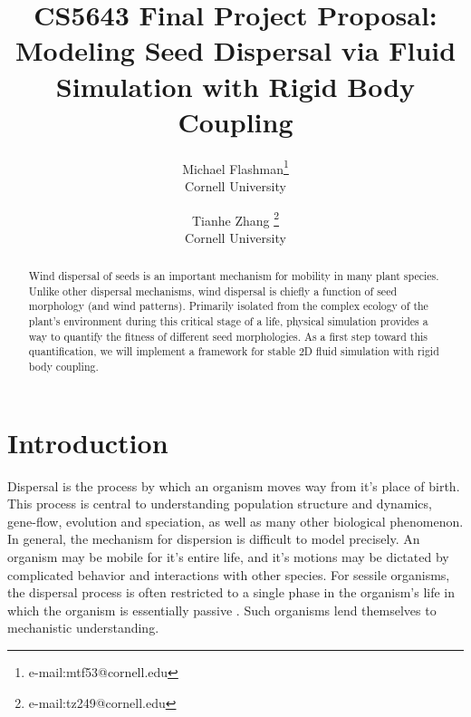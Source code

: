 \documentclass[annual]{acmsiggraph}
\title{CS5643 Final Project Proposal: \\ Modeling Seed Dispersal via Fluid Simulation with Rigid Body Coupling}
\author{Michael Flashman\thanks{e-mail:mtf53@cornell.edu}\\Cornell University \and Tianhe Zhang \thanks{e-mail:tz249@cornell.edu}\\Cornell University}
\begin{document}
\maketitle

\begin{abstract}
Wind dispersal of  seeds is an important mechanism for mobility in many plant species.  Unlike other dispersal mechanisms, wind dispersal is chiefly a function of seed morphology (and wind patterns).  Primarily isolated from the  complex ecology of the plant's environment during this critical stage of a life, physical simulation provides a way to  quantify the fitness of different seed morphologies.   As a first step toward this quantification, we will implement a  framework for stable 2D fluid simulation with rigid body coupling.
\end{abstract}

\keywordlist

\copyrightspace

\section{Introduction}


Dispersal is the process by which an organism moves way from it's place of birth.  This process is central to understanding  population structure and dynamics, gene-flow, evolution and speciation, as well as many other biological phenomenon\cite{levin1989}.   In general, the mechanism for dispersion is difficult to model precisely. An organism may be mobile for it's entire life, and it's motions may be dictated by complicated behavior and interactions with other species.  For sessile organisms, the dispersal process is often restricted to a single phase in the organism's life in which the organism is essentially passive \cite{nathan2000}.   Such organisms lend themselves to mechanistic understanding.  
\end{document}
